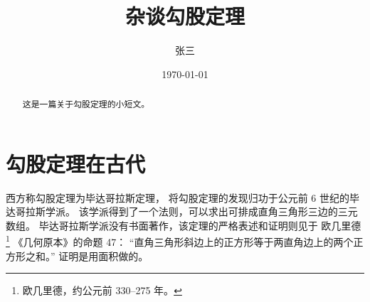 \documentclass[hyperref,UTF8,c5size]{ctexart}
\title{\heiti\zihao{0} 杂谈勾股定理}
\author{\kaishu 张三}
\date{\today}
\begin{document}
\maketitle

\begin{abstract}
        这是一篇关于勾股定理的小短文。
\end{abstract}


\thispagestyle{empty}

\clearpage


\pagestyle{plain}

\tableofcontents

\clearpage
{}
\pagestyle{headings}

\section{勾股定理在古代}
        西方称勾股定理为毕达哥拉斯定理，
        将勾股定理的发现归功于公元前 6 世纪的毕达哥拉斯学派\cite{Kline}。
        该学派得到了一个法则，可以求出可排成直角三角形三边的三元数组。
        毕达哥拉斯学派没有书面著作，该定理的严格表述和证明则见于
        欧几里德\footnote{欧几里德，约公元前 330--275 年。}
        《几何原本》的命题 47：
        “直角三角形斜边上的正方形等于两直角边上的两个正方形之和。”
        证明是用面积做的。
\end{document}
